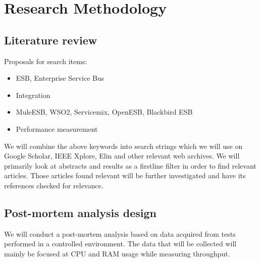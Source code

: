 \documentclass[10pt,a4paper]{proposal}
\begin{document}
\section*{Research Methodology}

	\subsection{Literature review}
	Proposals for search items:
	\begin{itemize}
		\item ESB, Enterprise Service Bus
		\item Integration
		\item MuleESB, WSO2, Servicemix, OpenESB, Blackbird ESB
		\item Performance measurement
	\end{itemize}
	We will combine the above keywords into search strings which we will use on Google Scholar, IEEE Xplore, Elin and other relevant web archives.
	We will primarily look at abstracts and results as a firstline filter in order to find relevant articles. Those articles found relevant will be further investigated and have its references checked for relevance.

	\subsection{Post-mortem analysis design}
		We will conduct a post-mortem analysis based on data acquired from tests performed in a controlled environment. 
		The data that will be collected will mainly be focused at CPU and RAM usage while measuring throughput. 

\footnotesize


 
 
\end{document}
